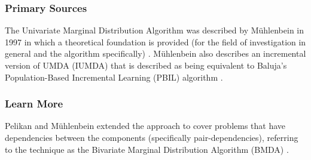 % 
% 
\subsubsection{Primary Sources}
The Univariate Marginal Distribution Algorithm was described by M\"uhlenbein in 1997 in which a theoretical foundation is provided (for the field of investigation in general and the algorithm specifically) \cite{Muhlenbein1997}. M\"uhlenbein also describes an incremental version of UMDA (IUMDA) that is described as being equivalent to Baluja's Population-Based Incremental Learning (PBIL) algorithm \cite{Baluja1994}.

% 
% 
\subsubsection{Learn More}
Pelikan and M\"uhlenbein extended the approach to cover problems that have dependencies between the components (specifically pair-dependencies), referring to the technique as the Bivariate Marginal Distribution Algorithm (BMDA) \cite{Pelikan1998, Pelikan1999}.


